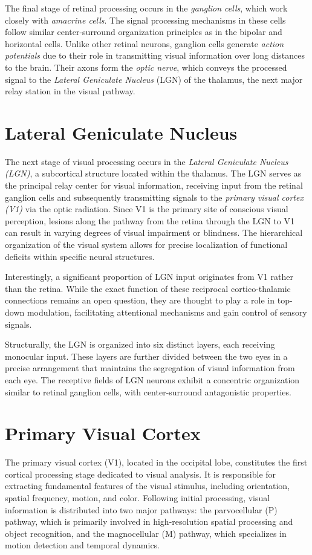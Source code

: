 The final stage of retinal processing occurs in the \emph{ganglion cells}, 
which work closely with \emph{amacrine cells}. The signal processing mechanisms 
in these cells follow similar center-surround organization principles as in 
the bipolar and horizontal cells. Unlike other retinal neurons, ganglion 
cells generate \emph{action potentials} due to their role in transmitting 
visual information over long distances to the brain. Their axons form the 
\emph{optic nerve}, which conveys the processed signal to the 
\emph{Lateral Geniculate Nucleus} (LGN) of the thalamus, the next major 
relay station in the visual pathway.

\section{Lateral Geniculate Nucleus}
\label{sec:lgn}
The next stage of visual processing occurs in the \emph{Lateral Geniculate Nucleus (LGN)}, 
a subcortical structure located within the thalamus. The LGN serves as the principal relay center 
for visual information, receiving input from the retinal ganglion cells and 
subsequently transmitting signals to the \emph{primary visual cortex (V1)} via the optic radiation. 
Since V1 is the primary site of conscious visual perception, lesions along the pathway from the 
retina through the LGN to V1 can result in varying degrees of visual impairment or blindness. 
The hierarchical organization of the visual system allows for precise localization of functional 
deficits within specific neural structures.

Interestingly, a significant proportion of LGN input originates from V1 rather than the retina. 
While the exact function of these reciprocal cortico-thalamic connections remains an open question, 
they are thought to play a role in top-down modulation, facilitating attentional mechanisms
and gain control of sensory signals.

Structurally, the LGN is organized into six distinct layers, each receiving monocular input. 
These layers are further divided between the two eyes in a precise arrangement that maintains 
the segregation of visual information from each eye. The receptive fields of LGN neurons exhibit a 
concentric organization similar to retinal ganglion cells, with center-surround antagonistic properties.

\section{Primary Visual Cortex}
\label{sec:v1}
The primary visual cortex (V1), located in the occipital lobe, constitutes the first 
cortical processing stage dedicated to visual analysis. It is responsible for extracting 
fundamental features of the visual stimulus, including orientation, spatial frequency, 
motion, and color. Following initial processing, visual information is distributed into 
two major pathways: the parvocellular (P) pathway, which is primarily involved in 
high-resolution spatial processing and object recognition, and the magnocellular (M) pathway, 
which specializes in motion detection and temporal dynamics.

